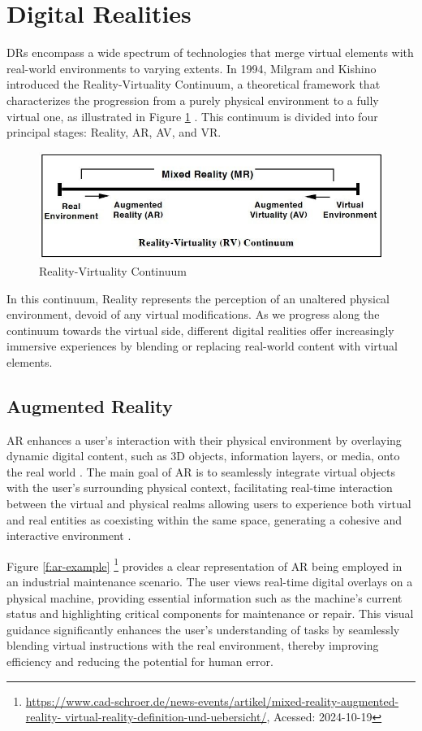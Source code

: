 \section{Digital Realities} 
\ac{DRs} encompass a wide spectrum of technologies that merge virtual elements with real-world environments to varying extents. In 1994, Milgram and Kishino introduced the Reality-Virtuality Continuum, a theoretical framework that characterizes the progression from a purely physical environment to a fully virtual one, as illustrated in Figure \ref{f:real-virtual-continuum} \cite{milgram1994}.
This continuum is divided into four principal stages: Reality, \ac{AR}, \ac{AV}, and \ac{VR}.

\begin{figure}[h]
    \centering
    \includegraphics[width=0.7\linewidth]{figs/vr-continuum.png}
    \caption{Reality-Virtuality Continuum~\cite{milgram1994}}
    \label{f:real-virtual-continuum}
\end{figure}

In this continuum, Reality represents the perception of an unaltered physical environment, devoid of any virtual modifications. As we progress along the continuum towards the virtual side, different digital realities offer increasingly immersive experiences by blending or replacing real-world content with virtual elements.

\subsection{Augmented Reality}
    \ac{AR} enhances a user's interaction with their physical environment by overlaying dynamic digital content, such as 3D objects, information layers, or media, onto the real world \cite{liu2022digitaltwin}. The main goal of \ac{AR} is to seamlessly integrate virtual objects with the user's surrounding physical context, facilitating real-time interaction between the virtual and physical realms allowing users to experience both virtual and real entities as coexisting within the same space, generating a cohesive and interactive environment \cite{Azuma1997}.
    
    Figure \ref{f:ar-example} \footnote{\url{https://www.cad-schroer.de/news-events/artikel/mixed-reality-augmented-reality-
    virtual-reality-definition-und-uebersicht/}, Acessed: 2024-10-19} provides a clear representation of \ac{AR} being employed in an industrial maintenance scenario. The user views real-time digital overlays on a physical machine, providing essential information such as the machine’s current status and highlighting critical components for maintenance or repair. This visual guidance significantly enhances the user’s understanding of tasks by seamlessly blending virtual instructions with the real environment, thereby improving efficiency and reducing the potential for human error.

